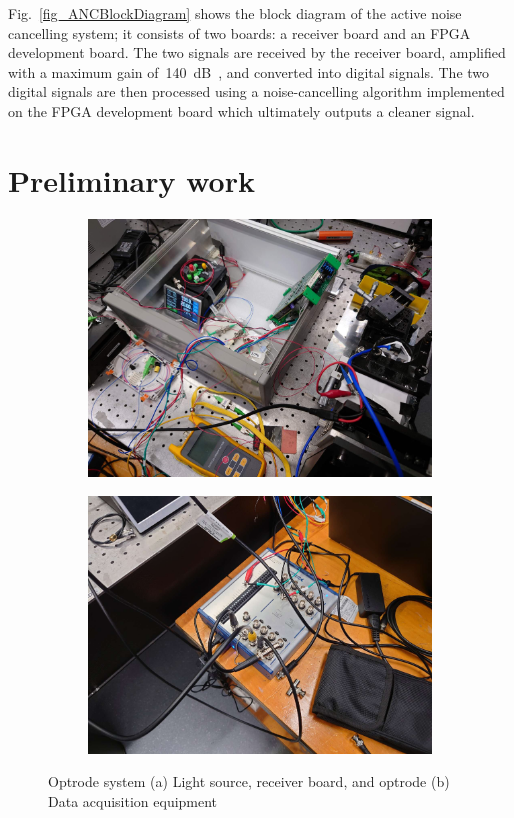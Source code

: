 Fig.~\ref{fig_ANCBlockDiagram} shows the block diagram of the active noise cancelling system;  it consists of two boards: a receiver board and an FPGA development board.  The two signals are received by the receiver board, amplified with a maximum gain of~\qty{140}{dB\Omega}, and converted into digital signals.  The two digital signals are then processed using a noise-cancelling algorithm implemented on the FPGA development board which ultimately outputs a cleaner signal.


\section{Preliminary work}

\begin{figure}
\centering
\begin{subfigure}{.5\textwidth}
  \centering
  \includegraphics[width=0.9\linewidth]{4-ANC_Sys/OptrodeSys.jpg}
  \caption{}
  \label{fig_OptrodeSysPartial}
\end{subfigure}%
\begin{subfigure}{.5\textwidth}
  \centering
  \includegraphics[width=0.9\linewidth]{4-ANC_Sys/DAQ.jpg}
  \caption{}
  \label{fig_DAQ}
\end{subfigure}
\caption{Optrode system (a) Light source, receiver board, and optrode (b) Data acquisition equipment}
\label{fig_OptrodeSys}
\end{figure}

